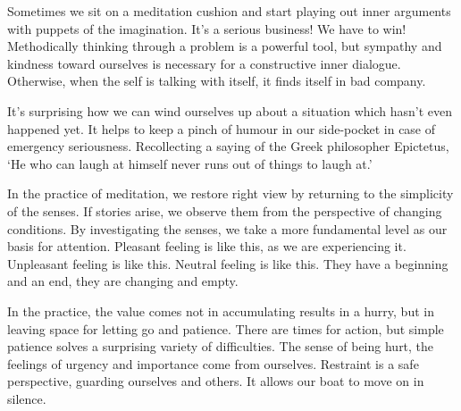Sometimes we sit on a meditation cushion and start playing out inner
arguments with puppets of the imagination. It's a serious business! We
have to win! Methodically thinking through a problem is a powerful tool,
but sympathy and kindness toward ourselves is necessary for a
constructive inner dialogue. Otherwise, when the self is talking with
itself, it finds itself in bad company.

\clearpage


It's surprising how we can wind ourselves up about a situation which
hasn't even happened yet. It helps to keep a pinch of humour in our
side-pocket in case of emergency seriousness. Recollecting a saying of
the Greek philosopher Epictetus, `He who can laugh at himself never runs
out of things to laugh at.'


In the practice of meditation, we restore right view by returning to the
simplicity of the senses. If stories arise, we observe them from the
perspective of changing conditions. By investigating the senses, we take
a more fundamental level as our basis for attention. Pleasant feeling is
like this, as we are experiencing it. Unpleasant feeling is like this.
Neutral feeling is like this. They have a beginning and an end, they are
changing and empty.

In the practice, the value comes not in accumulating results in a hurry,
but in leaving space for letting go and patience. There are times for
action, but simple patience solves a surprising variety of difficulties.
The sense of being hurt, the feelings of urgency and importance come
from ourselves. Restraint is a safe perspective, guarding ourselves and
others. It allows our boat to move on in silence.
